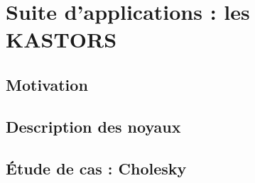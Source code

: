 \section{Suite d'applications : les KASTORS}
\subsection{Motivation}
\subsection{Description des noyaux}
\subsection{Étude de cas : Cholesky}

